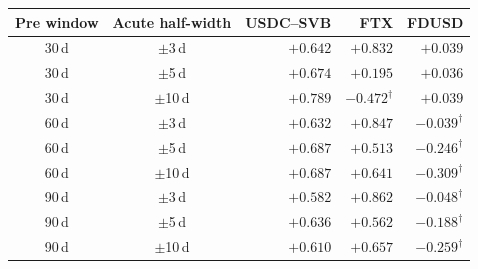 \begin{tabular}{@{}ccrrr@{}}
\toprule
Pre window & Acute half-width & USDC--SVB & FTX & FDUSD \\
\midrule
30\,d & $\pm$3\,d & $+0.642$ & $+0.832$ & $+0.039$ \\
30\,d & $\pm$5\,d & $+0.674$ & $+0.195$ & $+0.036$ \\
30\,d & $\pm$10\,d & $+0.789$ & $-0.472^{\dagger}$ & $+0.039$ \\
60\,d & $\pm$3\,d & $+0.632$ & $+0.847$ & $-0.039^{\dagger}$ \\
60\,d & $\pm$5\,d & $\mathbf{+0.687}$ & $\mathbf{+0.513}$ & $\mathbf{-0.246^{\dagger}}$ \\
60\,d & $\pm$10\,d & $+0.687$ & $+0.641$ & $-0.309^{\dagger}$ \\
90\,d & $\pm$3\,d & $+0.582$ & $+0.862$ & $-0.048^{\dagger}$ \\
90\,d & $\pm$5\,d & $+0.636$ & $+0.562$ & $-0.188^{\dagger}$ \\
90\,d & $\pm$10\,d & $+0.610$ & $+0.657$ & $-0.259^{\dagger}$ \\
\bottomrule
\end{tabular}
